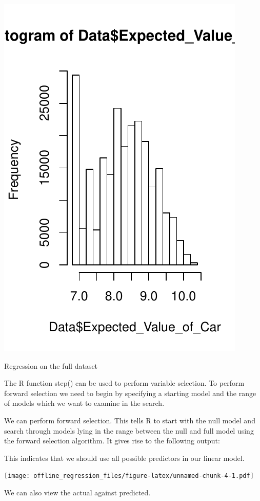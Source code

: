 \includegraphics{offline_regression_files/figure-latex/fighold-2.pdf}

Regression on the full dataset

The R function step() can be used to perform variable selection. To
perform forward selection we need to begin by specifying a starting
model and the range of models which we want to examine in the search.

We can perform forward selection. This tells R to start with the null
model and search through models lying in the range between the null and
full model using the forward selection algorithm. It gives rise to the
following output:

This indicates that we should use all possible predictors in our linear
model.


\texttt{[image: offline\_regression\_files/figure-latex/unnamed-chunk-4-1.pdf]}

We can also view the actual against predicted.


